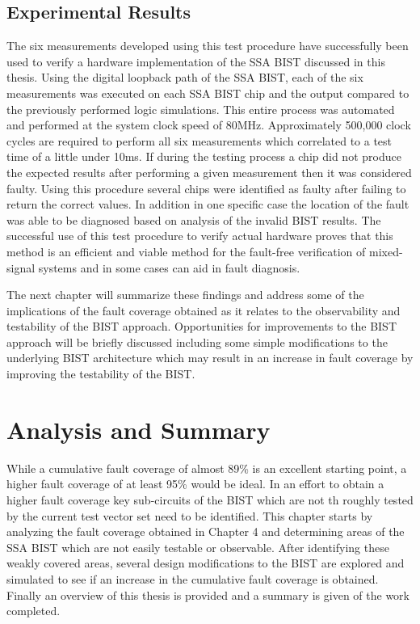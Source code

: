 \documentclass[12pt]{report}
\begin{document}
\section{Experimental Results}
The six measurements developed using this test procedure have successfully been used to verify a hardware implementation of the SSA BIST discussed in this thesis.  Using the digital loopback path of the SSA BIST, each of the six measurements was executed on each SSA BIST chip and the output compared to the previously performed logic simulations.   This entire process was automated and performed at the system clock speed of 80MHz.  Approximately 500,000 clock cycles are required to perform all six measurements which correlated to a test time of a little under 10ms.  If during the testing process a chip did not produce the expected results after performing a given measurement then it was considered faulty.  Using this procedure several chips were identified as faulty after failing to return the correct values.  In addition in one specific case the location of the fault was able to be diagnosed based on analysis of the invalid BIST results.  The successful use of this test procedure to verify actual hardware proves that this method is an efficient and viable method for the fault-free verification of mixed-signal systems and in some cases can aid in fault diagnosis.

The next chapter will summarize these findings and address some of the implications of the fault coverage obtained as it relates to the observability and testability of the BIST approach.  Opportunities for improvements to the BIST approach will be briefly discussed including some simple modifications to the underlying BIST architecture which may result in an increase in fault coverage by improving the testability of the BIST.

\chapter{Analysis and Summary}
While a cumulative fault coverage of almost 89\% is an excellent starting point, a higher fault coverage of at least 95\% would be ideal.  In an effort to obtain a higher fault coverage key sub-circuits of the BIST which are not th roughly tested by the current test vector set need to be identified.  This chapter starts by analyzing the fault coverage obtained in Chapter 4 and determining areas of the SSA BIST which are not easily testable or observable.  After identifying these weakly covered areas, several design modifications to the BIST are explored and simulated to see if an increase in the cumulative fault coverage is obtained.  Finally an overview of this thesis is provided and a summary is given of the work completed.
\end{document}
